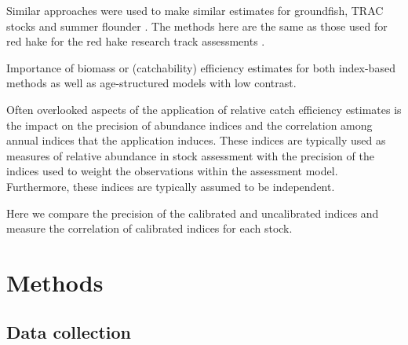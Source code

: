 \documentclass[]{article}
\begin{document}
Similar approaches were used to make similar estimates for groundfish,
TRAC stocks and summer flounder \citep{milleretal17a, milleretal17b}.
The methods here are the same as those used for red hake for the red
hake research track assessments \citep{milleretal20}.

Importance of biomass or (catchability) efficiency estimates for both
index-based methods as well as age-structured models with low contrast.

Often overlooked aspects of the application of relative catch efficiency
estimates is the impact on the precision of abundance indices and the
correlation among annual indices that the application induces. These
indices are typically used as measures of relative abundance in stock
assessment with the precision of the indices used to weight the
observations within the assessment model. Furthermore, these indices are
typically assumed to be independent.

Here we compare the precision of the calibrated and uncalibrated indices
and measure the correlation of calibrated indices for each stock.

\hypertarget{methods}{%
\section{Methods}\label{methods}}

\hypertarget{data-collection}{%
\subsection{Data collection}\label{data-collection}}
\end{document}
